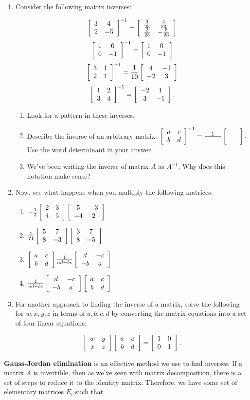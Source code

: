 \documentclass[../gatm.tex]{subfiles}
\begin{document}
\begin{enumerate}
\setcounter{enumi}{\value{problem_i}}
\item Consider the following matrix inverses:

$$\left[\begin{array}{cc} 3 & 4 \\ 2 & -5 \end{array}\right]^{-1}=\left[\begin{array}{cc} \frac{3}{23} & \frac{4}{23} \\ \frac{2}{23} & -\frac{5}{23} \end{array}\right]$$
$$\left[\begin{array}{cc} 1 & 0 \\ 0 & -1 \end{array}\right]^{-1}=\left[\begin{array}{cc} 1 & 0 \\ 0 & -1 \end{array}\right]$$
$$\left[\begin{array}{cc} 3 & 1 \\ 2 & 4 \end{array}\right]^{-1}=\frac{1}{10}\left[\begin{array}{cc} 4 & -1 \\ -2 & 3 \end{array}\right]$$
$$\left[\begin{array}{cc} 1 & 2 \\ 3 & 4 \end{array}\right]^{-1} = \left[\begin{array}{cc} -2 & 1 \\ 3 & -1 \end{array}\right].$$

\begin{enumerate}
\item Look for a pattern in these inverses.
\item Describe the inverse of an arbitrary matrix: $\left[\begin{array}{cc} a & c \\ b & d \end{array}\right]^{-1}=\frac{1}{\phantom{000000}}\left[\begin{array}{cc}  &  \\  &  \end{array}\right].$ Use the word determinant in your answer.
\item We've been writing the inverse of matrix $A$ as $A^{-1}$. Why does this notation make sense?
\end{enumerate}
\item Now, see what happens when you multiply the following matrices:
\begin{multicols}{2}
\begin{enumerate}
\item $-\frac{1}{2}\left[\begin{array}{cc} 2 & 3 \\ 4 & 5 \end{array}\right]\left[\begin{array}{cc} 5 & -3 \\ -4 & 2 \end{array}\right]$
\item $\frac{1}{71}\left[\begin{array}{cc} 5 & 7 \\ 8 & -3 \end{array}\right]\left[\begin{array}{cc} 3 & 7 \\ 8 & -5 \end{array}\right]$
\item $\left[\begin{array}{cc} a & c \\ b & d \end{array}\right]\frac{1}{ad-bc}\left[\begin{array}{cc} d & -c \\ -b & a \end{array}\right]$
\item $\frac{1}{ad-bc}\left[\begin{array}{cc} d & -c \\ -b & a \end{array}\right]\left[\begin{array}{cc} a & c \\ b & d \end{array}\right]$
\end{enumerate}
\end{multicols}
\item For another approach to finding the inverse of a matrix, solve the following for $w,x,y,z$ in terms of $a,b,c,d$ by converting the matrix equations into a set of four linear equations:

$$\left[\begin{array}{cc} w & y \\ x & z \end{array}\right]\left[\begin{array}{cc} a & c \\ b & d \end{array}\right]=\left[\begin{array}{cc} 1 & 0 \\ 0 & 1 \end{array}\right].$$
\setcounter{problem_i}{\value{enumi}}
\end{enumerate}

\noindent\textbf{Gauss-Jordan elimination} is an effective method we use to find inverses. If a matrix $A$ is invertible, then as we've seen with matrix decomposition, there is a set of steps to reduce it to the identity matrix. Therefore, we have some set of elementary matrices $E_i$ such that
\end{document}
